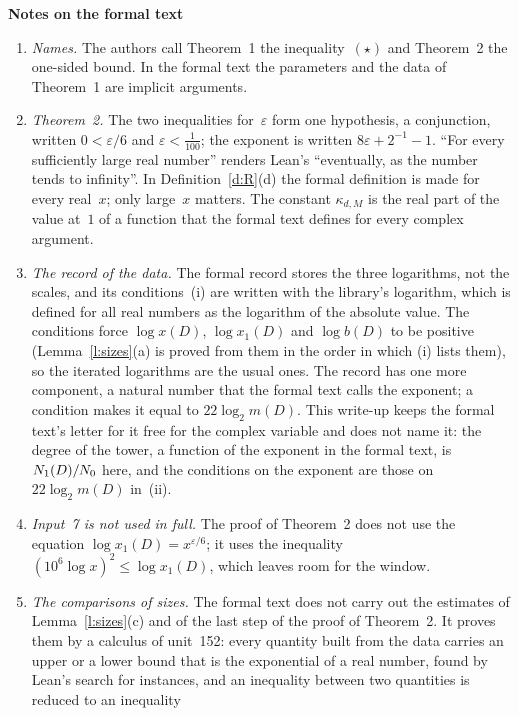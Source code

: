 \documentclass[11pt,a4paper]{article}
\newcommand{\m}[1]{\mbox{$#1$}}        %
\newcommand{\sect}[2]{\refstepcounter{section}\label{#2}\par\addvspace{19pt plus 4pt minus 2pt}\Needspace{7\baselineskip}%
  \noindent\llap{{\fontsize{13.2}{16}\selectfont\bfseries\color{inkfaint}\thesection}\hspace{9pt}}%
  {\fontsize{13.2}{16}\selectfont\bfseries\color{ink}#1}\par\nopagebreak\vspace{-1pt}}
\theoremstyle{plainx}
\theoremstyle{uprightx}
\newcommand{\kap}[2]{\kappa_{#1,#2}}
\newcommand{\scx}[1]{x(#1)}
\newcommand{\scxo}[1]{x_1(#1)}
\newcommand{\scb}[1]{b(#1)}
\newcommand{\Dm}[1]{m(#1)}
\begin{document}
\sect{Notes on the formal text}{s:notes}
\begin{enumerate}[label=\textup{\arabic*.},leftmargin=1.6em,itemsep=5pt]
\item \emph{Names.} The authors call Theorem~1 the inequality~$(\star)$ and Theorem~2 the one-sided bound. In the
formal text the parameters and the data of Theorem~1 are implicit arguments.
\item \emph{Theorem~2.} The two inequalities for~$\varepsilon$ form one hypothesis, a conjunction, written
\m{0<\varepsilon/6} and \m{\varepsilon<\tfrac1{100}}; the exponent is written \m{8\varepsilon+2^{-1}-1}. ``For
every sufficiently large real number'' renders Lean's ``eventually, as the number tends to infinity''. In
Definition~\ref{d:R}(d) the formal definition is made for every real~$x$; only large~$x$ matters. The constant
$\kap{d}{M}$ is the real part of the value at~$1$ of a function that the formal text defines for every complex
argument.
\item \emph{The record of the data.} The formal record stores the three logarithms, not the scales, and its
conditions~(i) are written with the library's logarithm, which is defined for all real numbers as the logarithm of
the absolute value. The conditions force \m{\log \scx{D}}, \m{\log \scxo{D}} and \m{\log \scb{D}} to be positive
(Lemma~\ref{l:sizes}(a) is proved from them in the order in which (i) lists them), so the iterated logarithms are
the usual ones. The record has one more component, a natural number that the formal text calls the exponent; a
condition makes it equal to \m{22\log_2\Dm{D}}. This write-up keeps the formal text's letter for it free for the
complex variable and does not name it: the degree of the tower, a function of the exponent in the formal text, is
\m{\None{D}/N_0} here, and the conditions on the exponent are those on \m{22\log_2\Dm{D}} in~(ii).
\item \emph{Input~7 is not used in full.} The proof of Theorem~2 does not use the equation
\m{\log \scxo{D}=x^{\varepsilon/6}}; it uses the inequality \m{(10^{6}\log x)^{2}\le\log \scxo{D}}, which leaves room for the
window.
\item \emph{The comparisons of sizes.} The formal text does not carry out the estimates of
Lemma~\ref{l:sizes}(c) and of the last step of the proof of Theorem~2. It proves them by a calculus of unit~152:
every quantity built from the data carries an upper or a lower bound that is the exponential of a real number,
found by Lean's search for instances, and an inequality between two quantities is reduced to an inequality

\end{enumerate}
\end{document}

